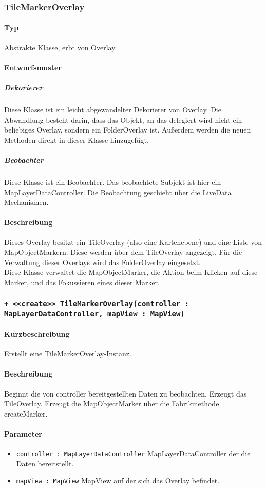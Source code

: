 \subsubsection{TileMarkerOverlay}
\paragraph*{Typ} 
Abstrakte Klasse, erbt von Overlay.
\paragraph*{Entwurfsmuster}
\subparagraph*{Dekorierer}
Diese Klasse ist ein leicht abgewandelter Dekorierer von Overlay.
Die Abwandlung besteht darin, dass das Objekt, an das delegiert wird nicht ein
beliebiges Overlay, sondern ein FolderOverlay ist. Außerdem werden die neuen 
Methoden direkt in dieser Klasse hinzugefügt.\\
\subparagraph*{Beobachter}
Diese Klasse ist ein Beobachter. Das beobachtete Subjekt ist hier ein MapLayerDataController.
Die Beobachtung geschieht über die LiveData Mechanismen.
\paragraph*{Beschreibung}
Dieses Overlay besitzt ein TileOverlay (also eine Kartenebene) und eine 
Liste von MapObjectMarkern. Diese werden über dem TileOverlay angezeigt.
Für die Verwaltung dieser Overlays wird das FolderOverlay eingesetzt.\\
Diese Klasse verwaltet die MapObjectMarker, die Aktion beim Klicken auf diese Marker, 
und das Fokussieren eines dieser Marker.

\subsubsection*{\texttt{+ <<create>> TileMarkerOverlay(controller : MapLayerDataController, mapView : MapView)}}%
\paragraph*{Kurzbeschreibung}
Erstellt eine TileMarkerOverlay-Instanz.
\paragraph*{Beschreibung}
Beginnt die von controller bereitgestellten Daten zu beobachten. Erzeugt das TileOverlay.
Erzeugt die MapObjectMarker über die Fabrikmethode createMarker.
\paragraph*{Parameter}
\begin{itemize}
    \item \texttt{controller : MapLayerDataController} MapLayerDataController der die Daten bereitstellt.
    \item \texttt{mapView : MapView} MapView auf der sich das Overlay befindet.
\end{itemize}

